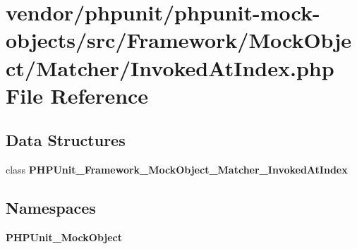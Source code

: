 \section{vendor/phpunit/phpunit-\/mock-\/objects/src/\+Framework/\+Mock\+Object/\+Matcher/\+Invoked\+At\+Index.php File Reference}
\label{_invoked_at_index_8php}
\subsection*{Data Structures}
\begin{DoxyCompactItemize}
\item 
class {\bf P\+H\+P\+Unit\+\_\+\+Framework\+\_\+\+Mock\+Object\+\_\+\+Matcher\+\_\+\+Invoked\+At\+Index}
\end{DoxyCompactItemize}
\subsection*{Namespaces}
\begin{DoxyCompactItemize}
\item 
 {\bf P\+H\+P\+Unit\+\_\+\+Mock\+Object}
\end{DoxyCompactItemize}

